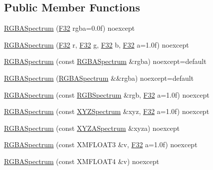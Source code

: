 \subsection*{Public Member Functions}
\begin{DoxyCompactItemize}
\item 
\hyperlink{structmage_1_1_r_g_b_a_spectrum_ae12e5c982af8385d4cd75bd1b42433f9}{R\+G\+B\+A\+Spectrum} (\hyperlink{namespacemage_aa97e833b45f06d60a0a9c4fc22ae02c0}{F32} rgba=0.\+0f) noexcept
\item 
\hyperlink{structmage_1_1_r_g_b_a_spectrum_ad489dd6da52a93fc9b6561b0adbae4f0}{R\+G\+B\+A\+Spectrum} (\hyperlink{namespacemage_aa97e833b45f06d60a0a9c4fc22ae02c0}{F32} r, \hyperlink{namespacemage_aa97e833b45f06d60a0a9c4fc22ae02c0}{F32} g, \hyperlink{namespacemage_aa97e833b45f06d60a0a9c4fc22ae02c0}{F32} b, \hyperlink{namespacemage_aa97e833b45f06d60a0a9c4fc22ae02c0}{F32} a=1.\+0f) noexcept
\item 
\hyperlink{structmage_1_1_r_g_b_a_spectrum_add56e3d1cae8f0f170ffd5c950409d12}{R\+G\+B\+A\+Spectrum} (const \hyperlink{structmage_1_1_r_g_b_a_spectrum}{R\+G\+B\+A\+Spectrum} \&rgba) noexcept=default
\item 
\hyperlink{structmage_1_1_r_g_b_a_spectrum_ac53917f6129baafb04d812fcef6e4f56}{R\+G\+B\+A\+Spectrum} (\hyperlink{structmage_1_1_r_g_b_a_spectrum}{R\+G\+B\+A\+Spectrum} \&\&rgba) noexcept=default
\item 
\hyperlink{structmage_1_1_r_g_b_a_spectrum_a4719336b65bee8fc81cffecdc28e2efa}{R\+G\+B\+A\+Spectrum} (const \hyperlink{structmage_1_1_r_g_b_spectrum}{R\+G\+B\+Spectrum} \&rgb, \hyperlink{namespacemage_aa97e833b45f06d60a0a9c4fc22ae02c0}{F32} a=1.\+0f) noexcept
\item 
\hyperlink{structmage_1_1_r_g_b_a_spectrum_a97124881633440ff2e088fc229652f85}{R\+G\+B\+A\+Spectrum} (const \hyperlink{structmage_1_1_x_y_z_spectrum}{X\+Y\+Z\+Spectrum} \&xyz, \hyperlink{namespacemage_aa97e833b45f06d60a0a9c4fc22ae02c0}{F32} a=1.\+0f) noexcept
\item 
\hyperlink{structmage_1_1_r_g_b_a_spectrum_a04aab6648f23cc920973aa396edd2b58}{R\+G\+B\+A\+Spectrum} (const \hyperlink{structmage_1_1_x_y_z_a_spectrum}{X\+Y\+Z\+A\+Spectrum} \&xyza) noexcept
\item 
\hyperlink{structmage_1_1_r_g_b_a_spectrum_ad6e122725c0a89373393fda240456910}{R\+G\+B\+A\+Spectrum} (const X\+M\+F\+L\+O\+A\+T3 \&v, \hyperlink{namespacemage_aa97e833b45f06d60a0a9c4fc22ae02c0}{F32} a=1.\+0f) noexcept
\item 
\hyperlink{structmage_1_1_r_g_b_a_spectrum_ae6c70539a602c52a9952a2c1fa5fa2ed}{R\+G\+B\+A\+Spectrum} (const X\+M\+F\+L\+O\+A\+T4 \&v) noexcept

\end{DoxyCompactItemize}
